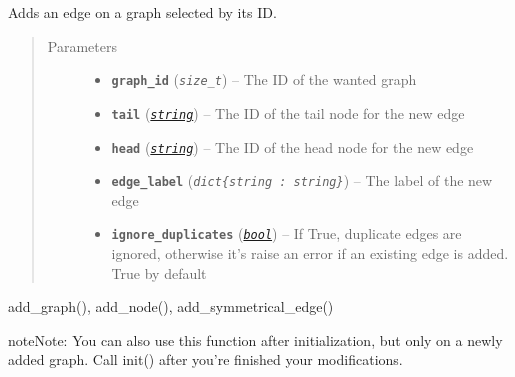 \documentclass[letterpaper,10pt,english]{sphinxmanual}
\begin{document}
\begin{fulllineitems}
\label{doc:gedlibpy.add_edge}
Adds an edge on a graph selected by its ID.
\begin{quote}\begin{description}
\item[{Parameters}] \leavevmode\begin{itemize}
\item {} 
\textbf{\texttt{graph\_id}} (\emph{\texttt{size\_t}}) -- The ID of the wanted graph

\item {} 
\textbf{\texttt{tail}} (\href{https://docs.python.org/3/library/string.html\#module-string}{\emph{\texttt{string}}}) -- The ID of the tail node for the new edge

\item {} 
\textbf{\texttt{head}} (\href{https://docs.python.org/3/library/string.html\#module-string}{\emph{\texttt{string}}}) -- The ID of the head node for the new edge

\item {} 
\textbf{\texttt{edge\_label}} (\emph{\texttt{dict\{string : string\}}}) -- The label of the new edge

\item {} 
\textbf{\texttt{ignore\_duplicates}} (\href{https://docs.python.org/3/library/functions.html\#bool}{\emph{\texttt{bool}}}) -- If True, duplicate edges are ignored, otherwise it's raise an error if an existing edge is added. True by default

\end{itemize}

\end{description}\end{quote}




add\_graph(), add\_node(), add\_symmetrical\_edge()



\begin{notice}{note}{Note:}
You can also use this function after initialization, but only on a newly added graph. Call init() after you're finished your modifications.
\end{notice}

\end{fulllineitems}

\end{document}

